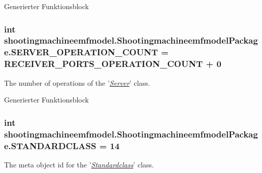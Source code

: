 Generierter Funktionsblock  \hypertarget{interfaceshootingmachineemfmodel_1_1_shootingmachineemfmodel_package_a2099b192ce21fd280f2a1cf282c646be}{
\subsubsection[{S\-E\-R\-V\-E\-R\-\_\-\-O\-P\-E\-R\-A\-T\-I\-O\-N\-\_\-\-C\-O\-U\-N\-T}]{\setlength{\rightskip}{0pt plus 5cm}int shootingmachineemfmodel.\-Shootingmachineemfmodel\-Package.\-S\-E\-R\-V\-E\-R\-\_\-\-O\-P\-E\-R\-A\-T\-I\-O\-N\-\_\-\-C\-O\-U\-N\-T = {\bf R\-E\-C\-E\-I\-V\-E\-R\-\_\-\-P\-O\-R\-T\-S\-\_\-\-O\-P\-E\-R\-A\-T\-I\-O\-N\-\_\-\-C\-O\-U\-N\-T} + 0}}\label{interfaceshootingmachineemfmodel_1_1_shootingmachineemfmodel_package_a2099b192ce21fd280f2a1cf282c646be}
The number of operations of the '{\itshape \hyperlink{interfaceshootingmachineemfmodel_1_1_server}{Server}}' class.

Generierter Funktionsblock  \hypertarget{interfaceshootingmachineemfmodel_1_1_shootingmachineemfmodel_package_ae1c5b272bef559844d19b2f28cadf5dc}{
\subsubsection[{S\-T\-A\-N\-D\-A\-R\-D\-C\-L\-A\-S\-S}]{\setlength{\rightskip}{0pt plus 5cm}int shootingmachineemfmodel.\-Shootingmachineemfmodel\-Package.\-S\-T\-A\-N\-D\-A\-R\-D\-C\-L\-A\-S\-S = 14}}\label{interfaceshootingmachineemfmodel_1_1_shootingmachineemfmodel_package_ae1c5b272bef559844d19b2f28cadf5dc}
The meta object id for the '\hyperlink{classshootingmachineemfmodel_1_1impl_1_1_standardclass_impl}{{\itshape Standardclass}}' class.

